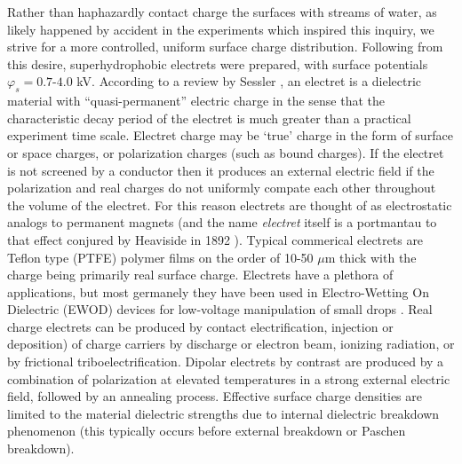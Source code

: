 \documentclass[12pt,a4paper,oneside]{book}
\begin{document}
Rather than haphazardly contact charge the surfaces with streams of water, as likely happened by accident in the experiments which inspired this inquiry, we strive for a more controlled, uniform surface charge distribution. Following from this desire, superhydrophobic electrets were prepared, with surface potentials $\varphi_s = 0.7$-$4.0$ kV. According to a review by Sessler \cite{_electrets_????}, an electret is a dielectric material with ``quasi-permanent'' electric charge in the sense that the characteristic decay period of the electret is much greater than a practical experiment time scale. Electret charge may be `true' charge in the form of surface or space charges, or polarization charges (such as bound charges). If the electret is not screened by a conductor then it produces an external electric field if the polarization and real charges do not uniformly compate each other throughout the volume of the electret. For this reason electrets are thought of as electrostatic analogs to permanent magnets (and the name \emph{electret} itself is a portmantau to that effect conjured by Heaviside in 1892 \cite{heaviside_electrical_2011}). Typical commerical electrets are Teflon type (PTFE) polymer films on the order of 10-50 $\mu$m thick with the charge being primarily real surface charge. Electrets have a plethora of applications, but most germanely they have been used in Electro-Wetting On Dielectric (EWOD) devices for low-voltage manipulation of small drops \cite{wu_low-voltage_2010}. Real charge electrets can be produced by contact electrification, injection or deposition) of charge carriers by discharge or electron beam, ionizing radiation, or by frictional triboelectrification. Dipolar electrets by contrast are produced by a combination of polarization at elevated temperatures in a strong external electric field, followed by an annealing process. Effective surface charge densities are limited to the material dielectric strengths due to internal dielectric breakdown phenomenon (this typically occurs before external breakdown or Paschen breakdown). 
\end{document}
